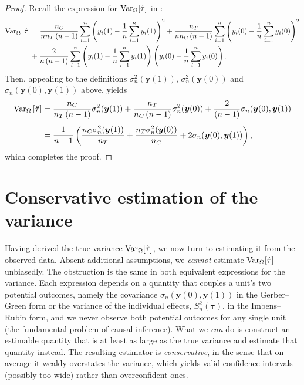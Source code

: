 \documentclass[12pt,leqno]{article}
\theoremstyle{newstyle}
\newcommand{\bZ}{\bm{Z}}   \newcommand{\bz}{\bm{z}}   %
\newcommand{\po}[2]{y_{#1}(#2)}     %
\newcommand{\pov}[1]{\bm{y}(#1)}    %
\newcommand{\tauhat}{\hat{\tau}}
\newcommand{\Ssq}[2][n]{S_{#1}^{2}(#2)}
\newcommand{\ssq}[2][n]{\sigma_{#1}^{2}(#2)}
\newcommand{\scov}[2][n]{\sigma_{#1}(#2)}
\begin{document}
\begin{proof}
Recall the expression for $\VarZ[\tauhat]$ in :
\begin{equation*}
\begin{split}
\VarZ\left[\tauhat\right] & = \dfrac{n_C}{n n_T \left(n - 1\right)} \sum \limits_{i = 1}^n \left(\po{i}{1} - \dfrac{1}{n} \sum \limits_{i = 1}^n \po{i}{1}\right)^2 + \dfrac{n_T}{n n_C \left(n - 1\right)} \sum \limits_{i = 1}^n \left(\po{i}{0} - \dfrac{1}{n} \sum \limits_{i = 1}^n \po{i}{0}\right)^2 \\ 
& + \dfrac{2}{n \left(n - 1\right)} \sum \limits_{i = 1}^n \left(\po{i}{1} - \dfrac{1}{n} \sum \limits_{i = 1}^n \po{i}{1}\right)\left(\po{i}{0} - \dfrac{1}{n} \sum \limits_{i = 1}^n \po{i}{0}\right).
\end{split}
\end{equation*}
Then, appealing to the definitions $\ssq{\pov{1}}$, $\ssq{\pov{0}}$ and $\scov{\pov{0}, \pov{1}}$ above, yields
\begin{align*}
\VarZ\left[\tauhat\right] & = \dfrac{n_C}{n_T \left(n - 1\right)} \ssq{\pov{1}} + \dfrac{n_T}{n_C \left(n - 1\right)} \ssq{\pov{0}} + \dfrac{2}{\left(n - 1\right)} \scov{\pov{0}, \pov{1}} \\[1ex]
& = \dfrac{1}{n - 1}\left(\dfrac{n_C\ssq{\pov{1}}}{n_T} + \dfrac{n_T \ssq{\pov{0}}}{n_C} + 2 \scov{\pov{0}, \pov{1}}\right),
\end{align*}
which completes the proof.
\end{proof}

\section{Conservative estimation of the variance}

Having derived the true variance $\VarZ[\tauhat]$, we now turn to estimating it from the observed data. Absent additional assumptions, we \textit{cannot} estimate $\VarZ[\tauhat]$ unbiasedly. The obstruction is the same in both equivalent expressions for the variance. Each expression depends on a quantity that couples a unit's two potential outcomes, namely the covariance $\scov{\pov{0}, \pov{1}}$ in the Gerber--Green form or the variance of the individual effects, $\Ssq{\bm{\tau}}$, in the Imbens--Rubin form, and we never observe both potential outcomes for any single unit (the fundamental problem of causal inference). What we \textit{can} do is construct an estimable quantity that is at least as large as the true variance and estimate that quantity instead. The resulting estimator is \textit{conservative}, in the sense that on average it weakly overstates the variance, which yields valid confidence intervals (possibly too wide) rather than overconfident ones.
\end{document}
